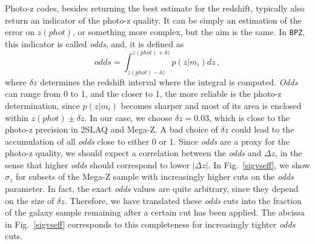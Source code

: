 Photo-z codes, besides returning the best estimate for the redshift, typically also return an indicator of the photo-z quality. It can be simply an estimation of the error on $z(phot)$, or something more complex, but the aim is the same. In \texttt{BPZ}, this indicator is called \textit{odds}, and, it is defined as
\begin{equation}
odds = \int^{z(phot)+\delta z}_{z(phot)-\delta z}p(z|m_i)dz \, ,
\label{odds}
\end{equation} 
where $\delta z$ determines the redshift interval where the integral is computed. \textit{Odds} can range from 0 to 1, and the closer to 1, the more reliable is the photo-z determination, since $p(z|m_i)$ becomes sharper and most of its area is enclosed within $z(phot)\pm \delta z$. In our case, we choose $\delta z = 0.03$, which is close to the photo-z precision in 2SLAQ and Mega-Z. A bad choice of $\delta z$ could lead to the accumulation of all \textit{odds} close to either 0 or 1. Since \textit{odds} are a proxy for the photo-z quality, we should expect a correlation between the \textit{odds} and $\Delta z$, in the sense that higher \textit{odds} should correspond to lower $|\Delta z|$. In Fig.~\ref{sigvseff}, we show $\sigma_z$ for subsets of the Mega-Z sample with increasingly higher cuts on the \textit{odds} parameter. In fact, the exact \textit{odds} values are quite arbitrary, since they depend on the size of $\delta z$. Therefore, we have translated these \textit{odds} cuts into the fraction of the galaxy sample remaining after a certain cut has been applied. The abcissa in Fig.~\ref{sigvseff} corresponds to this completeness for increasingly tighter \textit{odds} cuts. 
